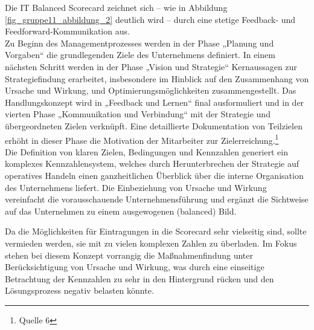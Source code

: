 Die IT Balanced Scorecard zeichnet sich – wie in Abbildung \ref{fig_gruppe11_abbildung_2} deutlich wird – durch eine stetige Feedback- und Feedforward-Kommunikation aus.\\

Zu Beginn des Managementprozesses werden in der Phase „Planung und Vorgaben“ die grundlegenden Ziele des Unternehmens definiert. In einem nächsten Schritt werden in der Phase „Vision und Strategie“ Kernaussagen zur Strategiefindung erarbeitet, insbesondere im Hinblick auf den Zusammenhang von Ursache und Wirkung, und Optimierungsmöglichkeiten zusammengestellt. Das Handlungskonzept wird in „Feedback und Lernen“ final ausformuliert und in der vierten Phase „Kommunikation und Verbindung“ mit der Strategie und übergeordneten Zielen verknüpft. Eine detaillierte Dokumentation von Teilzielen erhöht in dieser Phase die Motivation der Mitarbeiter zur Zielerreichung.\footnote{Quelle 6}\\

Die Definition von klaren Zielen, Bedingungen und Kennzahlen generiert ein komplexes Kennzahlensystem, welches durch Herunterbrechen der Strategie auf operatives Handeln einen ganzheitlichen Überblick über die interne Organisation des Unternehmens liefert. Die Einbeziehung von Ursache und Wirkung vereinfacht die vorausschauende Unternehmensführung und ergänzt die Sichtweise auf das Unternehmen zu einem ausgewogenen (balanced) Bild.

Da die Möglichkeiten für Eintragungen in die Scorecard sehr vielseitig sind, sollte vermieden werden, sie mit zu vielen komplexen Zahlen zu überladen. Im Fokus stehen bei diesem Konzept vorrangig die Maßnahmenfindung unter Berücksichtigung von Ursache und Wirkung, was durch eine einseitige Betrachtung der Kennzahlen zu sehr in den Hintergrund rücken und den Lösungsprozess negativ belasten könnte.



